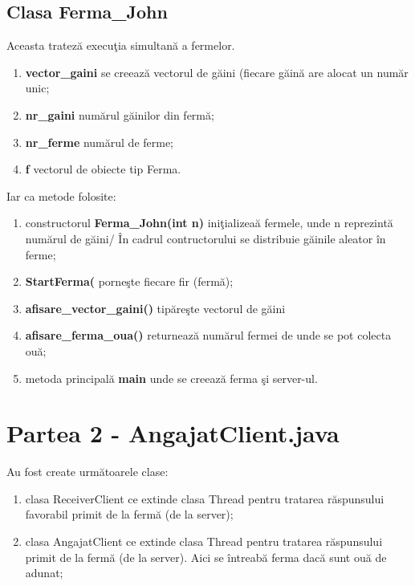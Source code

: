 \documentclass[12pt,a4paper]{article}
\begin{document}
\subsection{Clasa Ferma\_John}
	Aceasta tratez\u{a} execu\c{t}ia simultan\u{a} a fermelor. 
	\begin{enumerate}
		\item \textbf{vector\_gaini} se creeaz\u{a} vectorul de g\u{a}ini (fiecare g\u{a}in\u{a} are alocat un num\u{a}r unic;
		\item \textbf{nr\_gaini} num\u{a}rul g\u{a}inilor din ferm\u{a};  
  		\item \textbf{nr\_ferme} num\u{a}rul de ferme;
 		\item \textbf{f} vectorul de obiecte tip Ferma.
	\end{enumerate}	
	Iar ca metode folosite:	
	\begin{enumerate}
		\item constructorul \textbf{Ferma\_John(int n)} ini\c{t}ializea\u{a} fermele, unde n reprezint\u{a} num\u{a}rul de g\u{a}ini/ \^{I}n cadrul contructorului se distribuie g\u{a}inile aleator \^{i}n ferme;
		\item \textbf{StartFerma(} porne\c{s}te fiecare fir (ferm\u{a});
		\item \textbf{afisare\_vector\_gaini()} tip\u{a}re\c{s}te vectorul de g\u{a}ini
		\item \textbf{afisare\_ferma\_oua()} returneaz\u{a} num\u{a}rul fermei de unde se pot colecta ou\u{a};
		\item metoda principal\u{a} \textbf{main} unde se creeaz\u{a} ferma \c{s}i server-ul.
	\end{enumerate}

\section{Partea 2 - AngajatClient.java}
 	Au fost create urm\u{a}toarele clase:
    \begin{enumerate}
      \item clasa ReceiverClient  ce extinde clasa Thread pentru tratarea r\u{a}spunsului favorabil primit de la ferm\u{a} (de la server);
      \item clasa  AngajatClient ce extinde clasa Thread pentru tratarea r\u{a}spunsului primit de la ferm\u{a} (de la server). Aici se \^{i}ntreab\u{a} ferma dac\u{a} sunt ou\u{a} de adunat;
    \end{enumerate}
    
\end{document}
